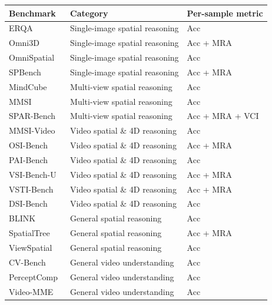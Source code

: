\documentclass{llmxive}
\providecommand{\arraystretch}{1.15}
\begin{document}
\begin{table}[!htbp]
\centering
\setlength{\tabcolsep}{4pt}
\renewcommand{\arraystretch}{1.15}
{\small
\begin{tabular}{lll}
\toprule
\textbf{Benchmark} & \textbf{Category} & \textbf{Per-sample metric} \\
\midrule
ERQA~\citep{team2025gemini}             & Single-image spatial reasoning & Acc \\
Omni3D~\citep{marsili2025visual}        & Single-image spatial reasoning & Acc + MRA \\
OmniSpatial~\citep{jia2025omnispatial}  & Single-image spatial reasoning & Acc \\
SPBench~\citep{xu2025spbench}           & Single-image spatial reasoning & Acc + MRA \\
\midrule
MindCube~\citep{yin2025mindcube}        & Multi-view spatial reasoning & Acc \\
MMSI~\citep{yang2025mmsi}               & Multi-view spatial reasoning & Acc \\
SPAR-Bench~\citep{zhang2025from}        & Multi-view spatial reasoning & Acc + MRA + VCI \\
\midrule
MMSI-Video~\citep{lin2025mmsivideo}     & Video spatial \& 4D reasoning & Acc \\
OSI-Bench~\citep{wu2025osibench}        & Video spatial \& 4D reasoning & Acc + MRA \\
PAI-Bench~\citep{zhou2025paibench}      & Video spatial \& 4D reasoning & Acc \\
VSI-Bench-U~\citep{brown2025shortcuts}  & Video spatial \& 4D reasoning & Acc + MRA \\
VSTI-Bench~\citep{fan2025vlm}           & Video spatial \& 4D reasoning & Acc + MRA \\
DSI-Bench~\citep{zhang2025dsibench}     & Video spatial \& 4D reasoning & Acc \\
\midrule
BLINK~\citep{fu2024blink}               & General spatial reasoning & Acc \\
SpatialTree~\citep{xiao2025spatialtree} & General spatial reasoning & Acc + MRA \\
ViewSpatial~\citep{li2025viewspatial}   & General spatial reasoning & Acc \\
\midrule
CV-Bench~\citep{zhu2025cvbench}         & General video understanding & Acc \\
PerceptComp~\citep{li2026perceptioncomp}& General video understanding & Acc \\
Video-MME~\citep{fu2025video}           & General video understanding & Acc \\

\end{tabular}}
\end{table}
\end{document}
